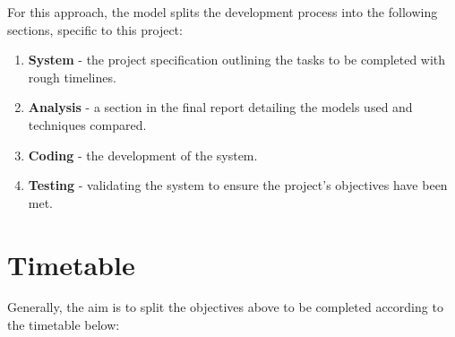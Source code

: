 \documentclass{article}
\begin{document}
For this approach, the model splits the development process into the following sections, specific to this project:

\begin{enumerate}
    \item \textbf{System} - the project specification outlining the tasks to be completed with rough timelines.
    \item \textbf{Analysis} - a section in the final report detailing the models used and techniques compared.
    \item \textbf{Coding} - the development of the system.
    \item \textbf{Testing} - validating the system to ensure the project's objectives have been met.
\end{enumerate}

\section{Timetable}
\label{timetable}
Generally, the aim is to split the objectives above to be completed according to the timetable below:
\end{document}
